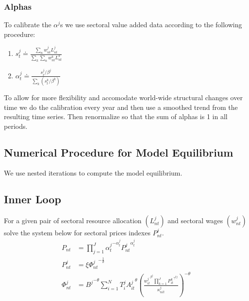 \documentclass[12pt]{article}
\begin{document}
\subsubsection{Alphas}

To calibrate the $\alpha^{j}$s we use sectoral value added data according to
the following procedure:

\begin{enumerate}
\item $s^j_{t} \doteq \frac{\sum_n w^j_{nt} L^j_{nt}}{\sum_k \sum_n w^k_{nt}
L^k_{nt}}$

\item $\alpha^j_t \doteq \frac{s^j_{t} / \beta^j}{\sum_k (s^k_{t} / \beta^k)}
$
\end{enumerate}

To allow for more flexibility and accomodate world-wide structural changes
over time we do the calibration every year and then use a smoothed trend
from the resulting time series. Then renormalize so that the sum of alphas
is 1 in all periods.

\subsection{Numerical Procedure for Model Equilibrium}

We use nested iterations to compute the model equilibrium.

\subsection{Inner Loop}
For a given pair of sectoral resource allocation $(L_{nt}^j)$ and sectoral wages $(w_{nt}^j)$ solve the system below for sectoral prices indexes $P_{nt}^j.$
\begin{align*}
P_{nt} &= \prod_{j = 1}^J {\alpha_t^j}^{- \alpha_t^j} {P_{nt}^j}^{\alpha_t^j} \\
%
P_{nt}^j &= \xi {\Phi_{nt}^j}^{-\frac{1}{\theta}}\\
%
\Phi_{nt}^j &= {B^j}^{-\theta} \sum_{i = 1}^N T_i^j {A_{it}^j}^{\theta} \left(\frac{{w_{it}^j}^{\beta^j} \prod_{k = 1}^{J}{P_{it}^k}^{\gamma^{kj}} }{\kappa_{nit}^j}\right)^{-\theta}  
\end{align*}
\end{document}
